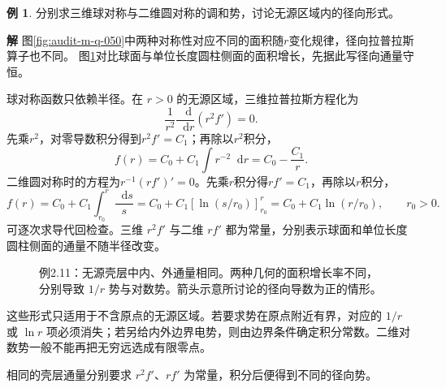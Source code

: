 \documentclass[11pt,openany,fontset=fandol]{ctexbook}
\theoremstyle{plain}\newtheorem{theorem}{定理}[chapter]\newtheorem{proposition}[theorem]{命题}
\theoremstyle{definition}\newtheorem{definition}{定义}[chapter]\newtheorem{example}{例}[chapter]
\theoremstyle{remark}\newtheorem*{remark}{说明}
\newcommand{\SolutionStart}{\par\nobreak\medskip\nobreak\noindent\textbf{解}\quad\ignorespaces}
\newenvironment{solution}{\SolutionStart}{\par\medskip}
\newcommand{\dd}{\mathop{}\!\mathrm d}\newcommand{\ii}{\mathrm i}\newcommand{\ee}{\mathrm e}
\newcommand{\vct}[1]{\bm{#1}}\newcommand{\Rea}{\operatorname{Re}}\newcommand{\Ima}{\operatorname{Im}}
\begin{document}
\begin{example}
分别求三维球对称与二维圆对称的调和势，讨论无源区域内的径向形式。
\end{example}

\begin{solution}
图\ref{fig:audit-m-q-050}中两种对称性对应不同的面积随$r$变化规律，径向拉普拉斯算子也不同。
图\ref{fig:eg-2-11}对比球面与单位长度圆柱侧面的面积增长，先据此写径向通量守恒。

球对称函数只依赖半径。在 $r>0$ 的无源区域，三维拉普拉斯方程化为
\[
\frac1{r^2}\frac{\dd}{\dd r}(r^2f')=0.
\]
先乘$r^2$，对零导数积分得到$r^2f'=C_1$；再除以$r^2$积分，
\[
f(r)=C_0+C_1\int r^{-2}\dd r=C_0-\frac{C_1}{r}.
\]
二维圆对称时的方程为$r^{-1}(rf')'=0$。先乘$r$积分得$rf'=C_1$，再除以$r$积分，
\[
f(r)=C_0+C_1\int_{r_0}^{r}\frac{\dd s}{s}
=C_0+C_1\left[\ln(s/r_0)\right]_{r_0}^r
=C_0+C_1\ln(r/r_0),\qquad r_0>0.
\]
可逐次求导代回检查。三维 $r^2f'$ 与二维 $rf'$ 都为常量，分别表示球面和单位长度圆柱侧面的通量不随半径改变。

\begin{figure}[H]\centering
{}
\caption{例2.11：无源壳层中内、外通量相同。两种几何的面积增长率不同，分别导致 $1/r$ 势与对数势。箭头示意所讨论的径向导数为正的情形。}\label{fig:eg-2-11}
\end{figure}

这些形式只适用于不含原点的无源区域。若要求势在原点附近有界，对应的 $1/r$ 或 $\ln r$ 项必须消失；若另给内外边界电势，则由边界条件确定积分常数。二维对数势一般不能再把无穷远选成有限零点。

相同的壳层通量分别要求 $r^2f'$、$rf'$ 为常量，积分后便得到不同的径向势。
\end{solution}
\end{document}
